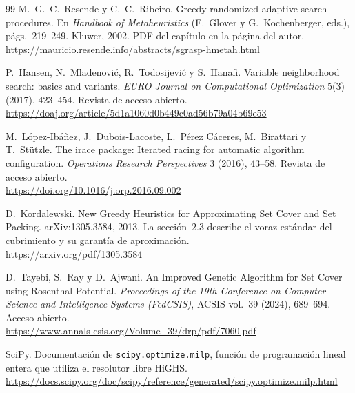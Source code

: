 \begin{thebibliography}{99}
M.~G.~C.~Resende y C.~C.~Ribeiro. Greedy randomized adaptive search procedures. En
\emph{Handbook of Metaheuristics} (F.~Glover y G.~Kochenberger, eds.), págs.~219--249.
Kluwer, 2002. PDF del capítulo en la página del autor.\\
\url{https://mauricio.resende.info/abstracts/sgrasp-hmetah.html}

P.~Hansen, N.~Mladenović, R.~Todosijević y S.~Hanafi. Variable neighborhood search: basics
and variants. \emph{EURO Journal on Computational Optimization} 5(3) (2017), 423--454.
Revista de acceso abierto.\\
\url{https://doaj.org/article/5d1a1060d0b449c0ad56b79a04b69e53}

M.~López-Ibáñez, J.~Dubois-Lacoste, L.~Pérez Cáceres, M.~Birattari y T.~Stützle. The irace
package: Iterated racing for automatic algorithm configuration. \emph{Operations Research
Perspectives} 3 (2016), 43--58. Revista de acceso abierto.\\
\url{https://doi.org/10.1016/j.orp.2016.09.002}

D.~Kordalewski. New Greedy Heuristics for Approximating Set Cover and Set Packing.
arXiv:1305.3584, 2013. La sección~2.3 describe el voraz estándar del cubrimiento y su
garantía de aproximación.\\
\url{https://arxiv.org/pdf/1305.3584}

D.~Tayebi, S.~Ray y D.~Ajwani. An Improved Genetic Algorithm for Set Cover using Rosenthal
Potential. \emph{Proceedings of the 19th Conference on Computer Science and Intelligence
Systems (FedCSIS)}, ACSIS vol.~39 (2024), 689--694. Acceso abierto.\\
\url{https://www.annals-csis.org/Volume_39/drp/pdf/7060.pdf}

SciPy. Documentación de \texttt{scipy.optimize.milp}, función de programación lineal entera
que utiliza el resolutor libre HiGHS.\\
\url{https://docs.scipy.org/doc/scipy/reference/generated/scipy.optimize.milp.html}

\end{thebibliography}


